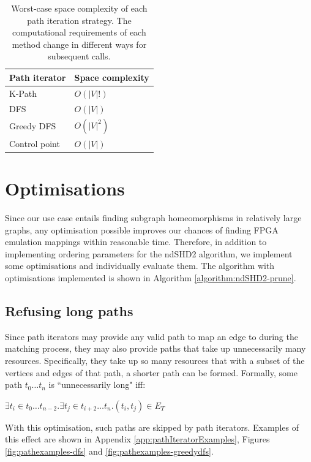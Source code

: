 \begin{table}
\centering
\begin{tabular}{|l|l|}
\hline
\textbf{Path iterator} & \textbf{Space complexity} \\ \hline
K-Path                 & $O(|V|!)$                 \\ \hline
DFS                    & $O(|V|)$                  \\ \hline
Greedy DFS             & $O(|V|^2)$                \\ \hline
Control point          & $O(|V|)$                  \\ \hline
\end{tabular}
\caption{Worst-case space complexity of each path iteration strategy. The computational requirements of each method change in different ways for subsequent calls.}
\label{tab:iterator-spacerequirements}
\end{table}


\section{Optimisations}
\label{sec:optimisations}
Since our use case entails finding subgraph homeomorphisms in relatively large graphs, any optimisation possible improves our chances of finding FPGA emulation mappings within reasonable time. Therefore, in addition to implementing ordering parameters for the ndSHD2 algorithm, we implement some optimisations and individually evaluate them. The algorithm with optimisations implemented is shown in Algorithm \ref{algorithm:ndSHD2-prune}.

\subsection{Refusing long paths}
\label{sec:refusinglongerpaths}
Since path iterators may provide any valid path to map an edge to during the matching process, they may also provide paths that take up unnecessarily many resources. Specifically, they take up so many resources that with a subset of the vertices and edges of that path, a shorter path can be formed. Formally, some path $t_0\dots t_n$ is ``unnecessarily long" iff:


$\exists t_i \in t_0\dots t_{n-2} . \exists t_j \in t_{i+2}\dots t_n . (t_i, t_j) \in E_T$

With this optimisation, such paths are skipped by path iterators. Examples of this effect are shown in Appendix \ref{app:pathIteratorExamples}, Figures \ref{fig:pathexamples-dfs}
 and \ref{fig:pathexamples-greedydfs}.

